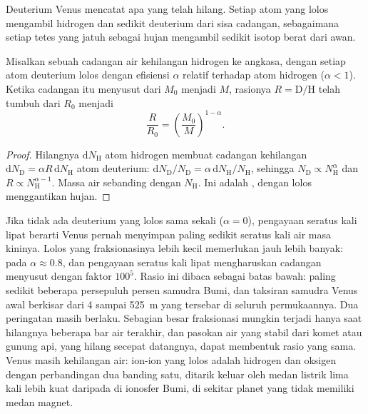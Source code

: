 Deuterium Venus mencatat apa yang telah hilang. Setiap atom yang lolos
mengambil hidrogen dan sedikit deuterium dari sisa cadangan, sebagaimana
setiap tetes yang jatuh sebagai hujan mengambil sedikit isotop berat dari
awan.

\begin{proposition}\label{prop:b3:planetary-atmospheres:dh}
Misalkan sebuah cadangan air kehilangan hidrogen ke angkasa, dengan setiap atom deuterium
lolos dengan efisiensi $\alpha$ relatif terhadap atom hidrogen
($\alpha < 1$). Ketika cadangan itu menyusut dari $M_0$ menjadi $M$, rasionya
$R = \mathrm{D}/\mathrm{H}$ telah tumbuh dari $R_0$ menjadi
\[
\frac R{R_0} = \left(\frac{M_0}M\right)^{1-\alpha}.
\]
\end{proposition}

\begin{proof}
Hilangnya $\mathrm dN_\mathrm H$ atom hidrogen membuat cadangan kehilangan
$\mathrm dN_\mathrm D = \alpha R\,\mathrm dN_\mathrm H$ atom deuterium:
$\mathrm dN_\mathrm D/N_\mathrm D = \alpha\,\mathrm dN_\mathrm H/
N_\mathrm H$, sehingga $N_\mathrm D \propto N_\mathrm H^\alpha$ dan $R \propto
N_\mathrm H^{\alpha - 1}$. Massa air sebanding dengan
$N_\mathrm H$. Ini adalah , dengan lolos menggantikan
hujan.
\end{proof}

Jika tidak ada deuterium yang lolos sama sekali ($\alpha = 0$), pengayaan seratus
kali lipat berarti Venus pernah menyimpan paling sedikit seratus kali air masa
kininya. Lolos yang fraksionasinya lebih kecil memerlukan jauh lebih banyak: pada
 $\alpha \approx 0.8$, dan pengayaan seratus kali lipat
mengharuskan cadangan menyusut dengan faktor $100^5$. Rasio ini dibaca sebagai
batas bawah: paling sedikit beberapa persepuluh persen samudra Bumi,
dan taksiran samudra Venus awal berkisar dari 4 sampai \qty{525}{m} yang tersebar
di seluruh permukaannya. Dua peringatan masih berlaku. Sebagian besar fraksionasi mungkin
terjadi hanya saat hilangnya beberapa bar air terakhir, dan pasokan air yang
stabil dari komet atau gunung api, yang hilang secepat datangnya, dapat
membentuk rasio yang sama. Venus masih kehilangan air: ion-ion yang lolos adalah
hidrogen dan oksigen dengan perbandingan dua banding satu, ditarik keluar oleh medan
listrik lima kali lebih kuat daripada di ionosfer Bumi, di sekitar
planet yang tidak memiliki medan magnet.

